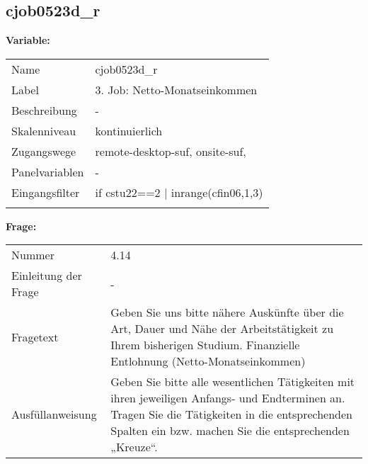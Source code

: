 	
	
	\subsection{cjob0523d\_r}
	\label{subSection:cjob0523d_r}

	\noindent\textbf{Variable:}\\
		\begin{tabular}{lL{11.3cm}}
			\label{tableVariable:cjob0523d_r}
			Name & cjob0523d\_r \\
			Label & 3. Job: Netto-Monatseinkommen \\
			Beschreibung & - \\
			Skalenniveau & kontinuierlich \\
			Zugangswege &
				remote-desktop-suf,
				onsite-suf,
 \\
			Panelvariablen & -
			 \\
			Eingangsfilter & if cstu22==2 | inrange(cfin06,1,3) \\
 \\
		\end{tabular}

		\vspace*{1 cm}
		\noindent\textbf{Frage:}\\
		\begin{tabular}{lL{11.3cm}}
			\label{tableQuestion:cjob0523d_r}
			Nummer & 4.14 \\
			Einleitung der Frage & - \\
			Fragetext & Geben Sie uns bitte nähere Auskünfte über die Art, Dauer und Nähe der Arbeitstätigkeit zu Ihrem bisherigen Studium.
Finanzielle Entlohnung
(Netto-Monatseinkommen) \\
			Ausfüllanweisung & Geben Sie bitte alle wesentlichen Tätigkeiten mit ihren jeweiligen Anfangs- und Endterminen an. Tragen Sie die Tätigkeiten in die entsprechenden Spalten ein bzw. machen Sie die entsprechenden „Kreuze“. \\
		\end{tabular}




